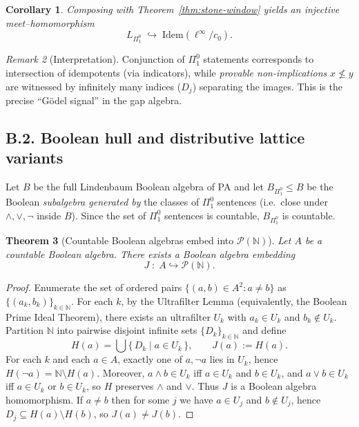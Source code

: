 \documentclass[11pt]{article}
\newtheorem{theorem}{Theorem}[section]
\newtheorem{corollary}[theorem]{Corollary}
\theoremstyle{definition}
\theoremstyle{remark}
\newtheorem{remark}[theorem]{Remark}
\newcommand{\N}{\mathbb{N}}
\begin{document}
\begin{corollary}\label{cor:Pi01-into-idem}
Composing with Theorem~\ref{thm:stone-window} yields an injective meet--homomorphism
\[
  L_{\Pi^0_1} \;\hookrightarrow\; \mathrm{Idem}(\ell^\infty/c_0).
\]
\end{corollary}

\begin{remark}[Interpretation]
Conjunction of $\Pi^0_1$ statements corresponds to intersection of idempotents (via indicators), while \emph{provable non-implications} $x\not\le y$ are witnessed by infinitely many indices ($D_j$) separating the images. This is the precise ``Gödel signal'' in the gap algebra.
\end{remark}

\subsection*{B.2. Boolean hull and distributive lattice variants}

Let $B$ be the full Lindenbaum Boolean algebra of PA and let $B_{\Pi^0_1}\le B$ be the Boolean \emph{subalgebra generated by} the classes of $\Pi^0_1$ sentences (i.e.\ close under $\wedge,\vee,\neg$ inside $B$). Since the set of $\Pi^0_1$ sentences is countable, $B_{\Pi^0_1}$ is countable.

\begin{theorem}[Countable Boolean algebras embed into $\mathcal{P}(\N)$]\label{thm:BA-embed}
Let $A$ be a countable Boolean algebra. There exists a Boolean algebra embedding
\[
  J \;:\; A \hookrightarrow \mathcal{P}(\N).
\]
\end{theorem}

\begin{proof}
Enumerate the set of ordered pairs $\{(a,b)\in A^2:a\ne b\}$ as $\{(a_k,b_k)\}_{k\in\N}$.
For each $k$, by the Ultrafilter Lemma (equivalently, the Boolean Prime Ideal Theorem), there exists an ultrafilter $U_k$ with $a_k\in U_k$ and $b_k\notin U_k$.
Partition $\N$ into pairwise disjoint infinite sets $\{D_k\}_{k\in\N}$ and define
\[
  H(a)=\bigcup\{\,D_k \mid a\in U_k\,\}, \qquad J(a):=H(a).
\]
For each $k$ and each $a\in A$, exactly one of $a,\neg a$ lies in $U_k$, hence $H(\neg a)=\N\setminus H(a)$.
Moreover, $a\wedge b\in U_k$ iff $a\in U_k$ and $b\in U_k$, and $a\vee b\in U_k$ iff $a\in U_k$ or $b\in U_k$, so $H$ preserves $\wedge$ and $\vee$.
Thus $J$ is a Boolean algebra homomorphism.
If $a\ne b$ then for some $j$ we have $a\in U_j$ and $b\notin U_j$, hence $D_j\subseteq H(a)\setminus H(b)$, so $J(a)\ne J(b)$.
\end{proof}
\end{document}
